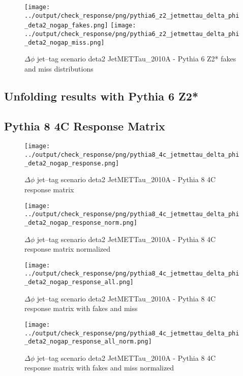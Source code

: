 \documentclass[11pt]{book}
\begin{document}
\begin{figure}[ht]
\centering
\texttt{[image: ../output/check\_response/png/pythia6\_z2\_jetmettau\_delta\_phi\_deta2\_nogap\_fakes.png]}
\texttt{[image: ../output/check\_response/png/pythia6\_z2\_jetmettau\_delta\_phi\_deta2\_nogap\_miss.png]}
\caption{$\Delta\phi$ jet--tag scenario deta2 JetMETTau\_2010A - Pythia 6 Z2* fakes and miss distributions}
\label{p6_jetmettau_delta_phi_deta2_nogap_fakesmiss}
\end{figure}


\clearpage
\subsection{Unfolding results with Pythia 6 Z2*}


\clearpage
\subsection{Pythia 8 4C Response Matrix}


\begin{figure}[ht]
\centering
\texttt{[image: ../output/check\_response/png/pythia8\_4c\_jetmettau\_delta\_phi\_deta2\_nogap\_response.png]}
\caption{$\Delta\phi$ jet--tag scenario deta2 JetMETTau\_2010A - Pythia 8 4C response matrix}
\label{p8_jetmettau_delta_phi_deta2_nogap_response}
\end{figure}

\begin{figure}[ht]
\centering
\texttt{[image: ../output/check\_response/png/pythia8\_4c\_jetmettau\_delta\_phi\_deta2\_nogap\_response\_norm.png]}
\caption{$\Delta\phi$ jet--tag scenario deta2 JetMETTau\_2010A - Pythia 8 4C response matrix normalized}
\label{p8_jetmettau_delta_phi_deta2_nogap_response_norm}
\end{figure}

\begin{figure}[ht]
\centering
\texttt{[image: ../output/check\_response/png/pythia8\_4c\_jetmettau\_delta\_phi\_deta2\_nogap\_response\_all.png]}
\caption{$\Delta\phi$ jet--tag scenario deta2 JetMETTau\_2010A - Pythia 8 4C response matrix with fakes and miss}
\label{p8_jetmettau_delta_phi_deta2_nogap_response_all}
\end{figure}

\begin{figure}[ht]
\centering
\texttt{[image: ../output/check\_response/png/pythia8\_4c\_jetmettau\_delta\_phi\_deta2\_nogap\_response\_all\_norm.png]}
\caption{$\Delta\phi$ jet--tag scenario deta2 JetMETTau\_2010A - Pythia 8 4C response matrix with fakes and miss normalized}
\label{p8_jetmettau_delta_phi_deta2_nogap_response_all_norm}
\end{figure}
\end{document}
